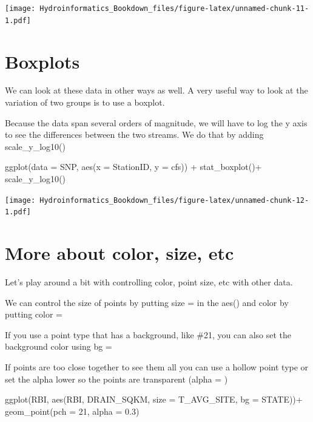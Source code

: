 \documentclass[
]{book}
\newenvironment{Shaded}{\begin{snugshade}}{\end{snugshade}}
\newcommand{\AttributeTok}[1]{\textcolor[rgb]{0.77,0.63,0.00}{#1}}
\newcommand{\DecValTok}[1]{\textcolor[rgb]{0.00,0.00,0.81}{#1}}
\newcommand{\FloatTok}[1]{\textcolor[rgb]{0.00,0.00,0.81}{#1}}
\newcommand{\FunctionTok}[1]{\textcolor[rgb]{0.00,0.00,0.00}{#1}}
\newcommand{\NormalTok}[1]{#1}
\newcommand{\SpecialCharTok}[1]{\textcolor[rgb]{0.00,0.00,0.00}{#1}}
\begin{document}
\texttt{[image: Hydroinformatics\_Bookdown\_files/figure-latex/unnamed-chunk-11-1.pdf]}

\hypertarget{boxplots}{%
\section{Boxplots}\label{boxplots}}

We can look at these data in other ways as well. A very useful way to look at the variation of two groups is to use a boxplot.

Because the data span several orders of magnitude, we will have to log the y axis to see the differences between the two streams. We do that by adding scale\_y\_log10()

\begin{Shaded}
\begin{Highlighting}[]
\FunctionTok{ggplot}\NormalTok{(}\AttributeTok{data =}\NormalTok{ SNP, }\FunctionTok{aes}\NormalTok{(}\AttributeTok{x =}\NormalTok{ StationID, }\AttributeTok{y =}\NormalTok{ cfs)) }\SpecialCharTok{+} 
  \FunctionTok{stat\_boxplot}\NormalTok{()}\SpecialCharTok{+}
  \FunctionTok{scale\_y\_log10}\NormalTok{()}
\end{Highlighting}
\end{Shaded}

\texttt{[image: Hydroinformatics\_Bookdown\_files/figure-latex/unnamed-chunk-12-1.pdf]}

\hypertarget{more-about-color-size-etc}{%
\section{More about color, size, etc}\label{more-about-color-size-etc}}

Let's play around a bit with controlling color, point size, etc with other data.

We can control the size of points by putting size = in the aes() and color by putting color =

If you use a point type that has a background, like \#21, you can also set the background color using bg =

If points are too close together to see them all you can use a hollow point type or set the alpha lower so the points are transparent (alpha = )

\begin{Shaded}
\begin{Highlighting}[]
\FunctionTok{ggplot}\NormalTok{(RBI, }\FunctionTok{aes}\NormalTok{(RBI, DRAIN\_SQKM, }\AttributeTok{size =}\NormalTok{ T\_AVG\_SITE, }\AttributeTok{bg =}\NormalTok{ STATE))}\SpecialCharTok{+}
  \FunctionTok{geom\_point}\NormalTok{(}\AttributeTok{pch =} \DecValTok{21}\NormalTok{, }\AttributeTok{alpha =} \FloatTok{0.3}\NormalTok{)}
\end{Highlighting}
\end{Shaded}
\end{document}
